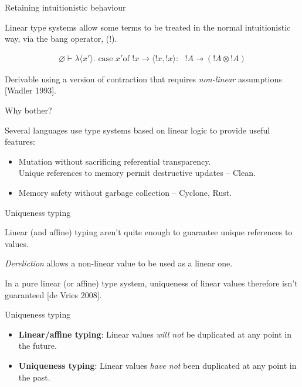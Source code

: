 \documentclass[10pt]{beamer}
\let\emptyset\varnothing
\newcommand{\case}{\text{ case }}
\newcommand{\of}{\text{of }}
\newcommand{\yields}{\multimap}
\begin{document}
\begin{frame}[fragile]{Retaining intuitionistic behaviour}

Linear type systems allow some terms to be treated in the normal intuitionistic way, via the bang operator, (!).

\begin{eqnarray*}
\emptyset \vdash \lambda \langle x' \rangle . \case x' \of !x \rightarrow \langle !x, !x \rangle :\text{ } !A \yields (!A \otimes !A)
\end{eqnarray*}

Derivable using a version of contraction that requires \textit{non-linear} assumptions [Wadler 1993].

\end{frame}

\begin{frame}{Why bother?}

Several languages use type systems based on linear logic to provide useful features:

\begin{itemize}
\item Mutation without sacrificing referential transparency.\\
      Unique references to memory permit destructive updates -- Clean.
\item Memory safety without garbage collection -- Cyclone, Rust.
\end{itemize}
\end{frame}

\begin{frame}{Uniqueness typing}

Linear (and affine) typing aren't quite enough to guarantee unique references to values.

\textit{Dereliction} allows a non-linear value to be used as a linear one.

In a pure linear (or affine) type system, uniqueness of linear values therefore isn't guaranteed [de Vries 2008].
\end{frame}

\begin{frame}{Uniqueness typing}

\begin{itemize}
\item \textbf{Linear/affine typing}: Linear values \textit{will not} be duplicated at any point in the future.
\item \textbf{Uniqueness typing}: Linear values \textit{have not} been duplicated at any point in the past.
\end{itemize}

\end{frame}
\end{document}
